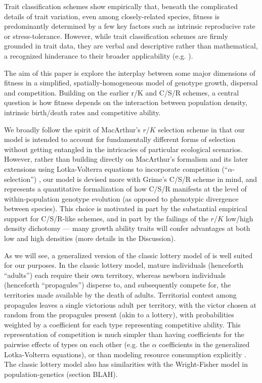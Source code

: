 \documentclass[11pt]{article}
\begin{document}
Trait classification schemes show empirically that, beneath the complicated details of trait variation, even among closely-related species, fitness is predominantly determined by a few key factors such as intrinsic reproducive rate or stress-tolerance. However, while trait classification schemes are firmly grounded in trait data, they are verbal and descriptive rather than mathematical, a recognized hinderance to their broader applicability (e.g. \citealt{tilman_2007}). 

The aim of this paper is explore the interplay between some major dimensions of fitness in a simplified, spatially-homogeneous model of genotype growth, dispersal and competition. Building on the earlier r/K and C/S/R schemes, a central question is how fitness depends on the interaction between population density, intrinsic birth/death rates and competitive ability. 

We broadly follow the spirit of MacArthur's $r$/$K$ selection scheme in that our model is intended to account for fundamentally different forms of selection without getting  entangled in the intricacies of particular ecological scenarios. However, rather than building directly on MacArthur's formalism and its later extensions using Lotka-Volterra equations to incorporate competition (``$\alpha$-selection'') \citep{gill_1974,case_1974,joshi_2001}, our model is devised more with Grime's C/S/R scheme in mind, and represents a quantitative formalization of how C/S/R manifests at the level of within-population genotype evolution (as opposed to phenotypic divergence between species). This choice is motivated in part by the substantial empirical support for C/S/R-like schemes, and in part by the failings of the $r$/$K$ low/high density dichotomy --- many growth ability traits will confer advantages at both low and high densities (more details in the Discussion). 

As we will see, a generalized version of the classic lottery model of \cite{chesson_1981} is well suited for our purposes. In the classic lottery model, mature individuals (henceforth ``adults'') each require their own territory, whereas newborn individuals (henceforth ``propagules'') disperse to, and subsequently compete for, the territories made available by the death of adults. Territorial contest among propagules leaves a single victorious adult per territory, with the victor chosen at random from the propagules present (akin to a lottery), with probabilities weighted by a coefficient for each type representing competitive ability. This representation of competition is much simpler than having coefficients for the pairwise effects of types on each other (e.g. the $\alpha$ coefficients in the generalized Lotka-Volterra equations), or than modeling resource consumption explicitly \citep{tilman_1982}. The classic lottery model also has similarities with the Wright-Fisher model in population-genetics (section BLAH). 
\end{document}
